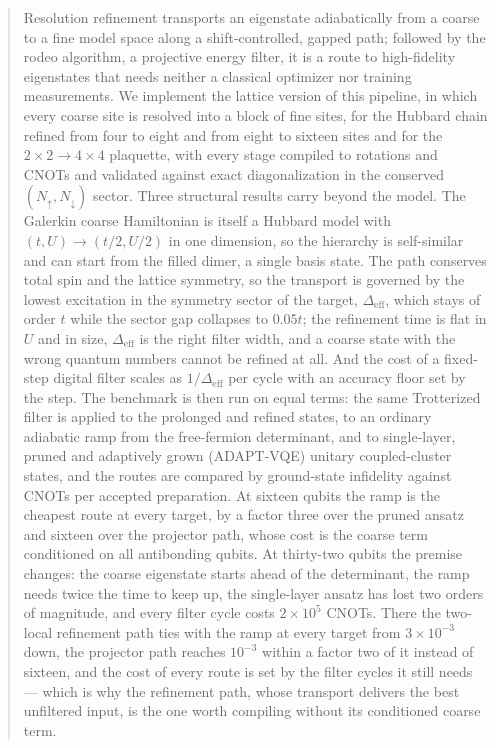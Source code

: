 \documentclass[a4paper,11pt,noarxiv]{quantumarticle}
\newcommand{\Deff}{\Delta_{\mathrm{eff}}}
\begin{document}
\begin{abstract}
Resolution refinement transports an eigenstate adiabatically from a coarse
to a fine model space along a shift-controlled, gapped path; followed by the
rodeo algorithm, a projective energy filter, it is a route to high-fidelity
eigenstates that needs neither a classical optimizer nor training
measurements.  We implement the lattice version of this pipeline, in which
every coarse site is resolved into a block of fine sites, for the Hubbard
chain refined from four to eight and from eight to sixteen sites and for the
$2\times2\to4\times4$ plaquette, with every stage compiled to rotations and
CNOTs and validated against exact diagonalization in the conserved
$(N_\uparrow,N_\downarrow)$ sector.  Three structural results carry beyond
the model.  The Galerkin coarse Hamiltonian is itself a Hubbard model with
$(t,U)\to(t/2,U/2)$ in one dimension, so the hierarchy is self-similar and
can start from the filled dimer, a single basis state.  The path conserves
total spin and the lattice symmetry, so the transport is governed by the
lowest excitation in the symmetry sector of the target, $\Deff$, which stays
of order $t$ while the sector gap collapses to $0.05t$; the refinement time
is flat in $U$ and in size, $\Deff$ is the right filter width, and a coarse
state with the wrong quantum numbers cannot be refined at all.  And the
cost of a fixed-step digital filter scales as $1/\Deff$ per cycle with an
accuracy floor set by the step.  The benchmark is then run on equal terms:
the same Trotterized filter is applied to the prolonged and refined states,
to an ordinary adiabatic ramp from the free-fermion determinant, and to
single-layer, pruned and adaptively grown (ADAPT-VQE) unitary coupled-cluster
states, and the routes are compared by ground-state infidelity against CNOTs
per accepted preparation.  At sixteen qubits the ramp is the cheapest route
at every target, by a factor three over the pruned ansatz and sixteen over
the projector path, whose cost is the coarse term conditioned on all
antibonding qubits.  At thirty-two qubits the premise changes: the coarse eigenstate starts
ahead of the determinant, the ramp needs twice the time to keep up, the
single-layer ansatz has lost two orders of magnitude, and every filter
cycle costs $2\times10^5$ CNOTs.  There the two-local refinement path ties
with the ramp at every target from $3\times10^{-3}$ down, the projector
path reaches $10^{-3}$ within a factor two of it instead of sixteen, and the cost of every route is set
by the filter cycles it still needs --- which is why the refinement path,
whose transport delivers the best unfiltered input, is the one worth
compiling without its conditioned coarse term.
\end{abstract}
\end{document}
